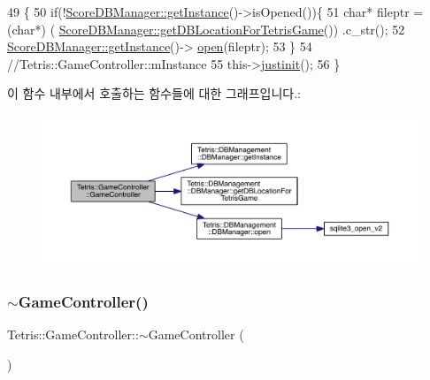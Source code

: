 \begin{DoxyCode}
49                             \{
50                 \textcolor{keywordflow}{if}(!\hyperlink{class_tetris_1_1_d_b_management_1_1_d_b_manager_a9cb81505055490211a9b5c79c3c22c18}{ScoreDBManager::getInstance}()->isOpened())\{
51                     \textcolor{keywordtype}{char}* fileptr =(\textcolor{keywordtype}{char}*) (
      \hyperlink{class_tetris_1_1_d_b_management_1_1_d_b_manager_ae50cfd222e276a5ca27e17c886aa5dd5}{ScoreDBManager::getDBLocationForTetrisGame}()) .c\_str();
52                     \hyperlink{class_tetris_1_1_d_b_management_1_1_d_b_manager_a9cb81505055490211a9b5c79c3c22c18}{ScoreDBManager::getInstance}()->
      \hyperlink{class_tetris_1_1_d_b_management_1_1_d_b_manager_a8bf7e756a9cca7e57fef00076fb62f36}{open}(fileptr);
53                 \}
54                 \textcolor{comment}{//Tetris::GameController::mInstance}
55                 this->\hyperlink{class_tetris_1_1_game_controller_aef406397d4719c9edd49774d0343ce05}{justinit}();
56             \}
\end{DoxyCode}
이 함수 내부에서 호출하는 함수들에 대한 그래프입니다.\+:
\nopagebreak
\begin{figure}[H]
\begin{center}
\leavevmode
\includegraphics[width=350pt]{db/dd2/class_tetris_1_1_game_controller_a968c9a79fca8a5a39e0c51edca0e5abb_cgraph}
\end{center}
\end{figure}
\mbox{\label{class_tetris_1_1_game_controller_a8c9011047ce96d89e4d913feb9a88eed}} 
\subsubsection{\texorpdfstring{$\sim$\+Game\+Controller()}{~GameController()}}
{\footnotesize\ttfamily Tetris\+::\+Game\+Controller\+::$\sim$\+Game\+Controller (\begin{DoxyParamCaption}{ }\end{DoxyParamCaption})\hspace{0.3cm}{\ttfamily [inline]}}



